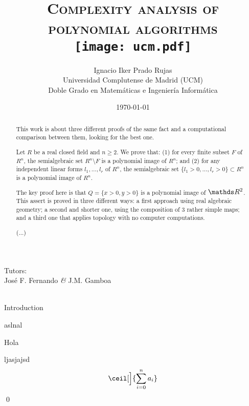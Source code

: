 \documentclass[11pt, a4paper, english, twoside, notitlepage]{report}
\begin{document}
\title{\huge{\textsc{Complexity analysis of polynomial algorithms}} \\
	\protect\texttt{[image: ucm.pdf]}}
\author{Ignacio Iker Prado Rujas \\
	Universidad Complutense de Madrid (UCM) \\
	Doble Grado en Matem\'aticas e Ingenier\'ia Inform\'atica}
\date{\today}
\maketitle
\begin{center}
	Tutors: \\
	Jos\'e F. Fernando \textit{\&} J.M. Gamboa \\
	\
\end{center}

\thispagestyle{empty}	
	
\begin{abstract}
	This work is about three different proofs of the same fact and a computational comparison between them, looking for the best one.

	Let $R$ be a real closed field and $n\geq 2$. We prove that: (1) for every finite subset $F$ of $R^n$,
	the semialgebraic set $R^n\setminus F$ is a polynomial image of $R^n$; and (2) for any
	independent linear forms $l_1,\ldots,l_r$ of $R^n$, the semialgebraic set
	$\{l_1>0,\ldots,l_r>0\}\subset R^n$ is a polynomial image of $R^n$.
	
	The key proof here is that $Q = \{x > 0, y > 0\}$ is a polynomial image of $\R^2$. This assert is proved in three different ways: a first approach using real algebraic geometry; a second and shorter one, using the composition of 3 rather simple maps; and a third one that applies topology with no computer computations.
	
	(...)
\end{abstract}

\newpage
\mbox{}
\thispagestyle{empty}    %
\newpage

\begin{chapter}{Introduction}

\lipsum[14-18]
\lipsum[15]

\lipsum[16]
aslnal
\begin{section}{Hola}
\lipsum[16]
\end{section}
\lipsum[16]
\begin{Proof}
ljasjajsd $$\ceil[\Big]{\sum_{i=0}^n a_i}$$ \qed 

\end{Proof}

\end{chapter}
\end{document}
